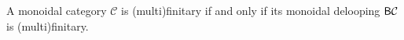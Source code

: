 


\noindent A monoidal category $\mathcal{C}$ is (multi)finitary if and only if its monoidal delooping $\textup{\textsf{B}}\mathcal{C}$ is (multi)finitary.\\


